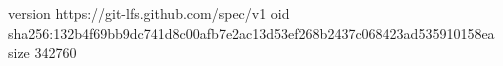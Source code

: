 version https://git-lfs.github.com/spec/v1
oid sha256:132b4f69bb9dc741d8c00afb7e2ac13d53ef268b2437c068423ad535910158ea
size 342760
